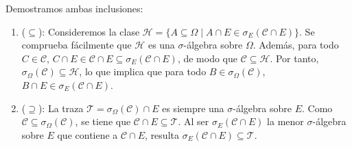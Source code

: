 \begin{demostracion}
Demostramos ambas inclusiones:
\begin{enumerate}
    \item ($\subseteq$): Consideremos la clase $\mathcal{H} = \{ A \subseteq \Omega \mid A \cap E \in \sigma_E(\mathcal{C} \cap E) \}$. Se comprueba fácilmente que $\mathcal{H}$ es una $\sigma$-álgebra sobre $\Omega$. Además, para todo $C \in \mathcal{C}$, $C \cap E \in \mathcal{C} \cap E \subseteq \sigma_E(\mathcal{C} \cap E)$, de modo que $\mathcal{C} \subseteq \mathcal{H}$. Por tanto, $\sigma_\Omega(\mathcal{C}) \subseteq \mathcal{H}$, lo que implica que para todo $B \in \sigma_\Omega(\mathcal{C})$, $B \cap E \in \sigma_E(\mathcal{C} \cap E)$.

    \item ($\supseteq$): La traza $\mathcal{T} = \sigma_\Omega(\mathcal{C}) \cap E$ es siempre una $\sigma$-álgebra sobre $E$. Como $\mathcal{C} \subseteq \sigma_\Omega(\mathcal{C})$, se tiene que $\mathcal{C} \cap E \subseteq \mathcal{T}$. Al ser $\sigma_E(\mathcal{C} \cap E)$ la menor $\sigma$-álgebra sobre $E$ que contiene a $\mathcal{C} \cap E$, resulta $\sigma_E(\mathcal{C} \cap E) \subseteq \mathcal{T}$.
\end{enumerate}
\end{demostracion}

